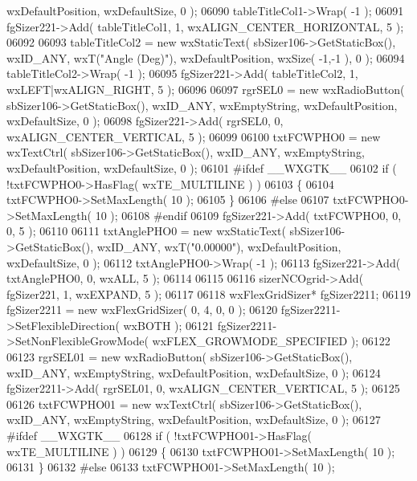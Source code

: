 \begin{DoxyCode}
      wxDefaultPosition, wxDefaultSize, 0 );
06090     tableTitleCol1->Wrap( -1 );
06091     fgSizer221->Add( tableTitleCol1, 1, wxALIGN\_CENTER\_HORIZONTAL, 5 );
06092     
06093     tableTitleCol2 = \textcolor{keyword}{new} wxStaticText( sbSizer106->GetStaticBox(), wxID\_ANY, wxT(\textcolor{stringliteral}{"Angle (Deg)"}), 
      wxDefaultPosition, wxSize( -1,-1 ), 0 );
06094     tableTitleCol2->Wrap( -1 );
06095     fgSizer221->Add( tableTitleCol2, 1, wxLEFT|wxALIGN\_RIGHT, 5 );
06096     
06097     rgrSEL0 = \textcolor{keyword}{new} wxRadioButton( sbSizer106->GetStaticBox(), wxID\_ANY, wxEmptyString, wxDefaultPosition, 
      wxDefaultSize, 0 );
06098     fgSizer221->Add( rgrSEL0, 0, wxALIGN\_CENTER\_VERTICAL, 5 );
06099     
06100     txtFCWPHO0 = \textcolor{keyword}{new} wxTextCtrl( sbSizer106->GetStaticBox(), wxID\_ANY, wxEmptyString, wxDefaultPosition, 
      wxDefaultSize, 0 );
06101 \textcolor{preprocessor}{    #ifdef \_\_WXGTK\_\_}
06102     \textcolor{keywordflow}{if} ( !txtFCWPHO0->HasFlag( wxTE\_MULTILINE ) )
06103     \{
06104     txtFCWPHO0->SetMaxLength( 10 );
06105     \}
06106 \textcolor{preprocessor}{    #else}
06107     txtFCWPHO0->SetMaxLength( 10 );
06108 \textcolor{preprocessor}{    #endif}
06109     fgSizer221->Add( txtFCWPHO0, 0, 0, 5 );
06110     
06111     txtAnglePHO0 = \textcolor{keyword}{new} wxStaticText( sbSizer106->GetStaticBox(), wxID\_ANY, wxT(\textcolor{stringliteral}{"0.00000"}), 
      wxDefaultPosition, wxDefaultSize, 0 );
06112     txtAnglePHO0->Wrap( -1 );
06113     fgSizer221->Add( txtAnglePHO0, 0, wxALL, 5 );
06114     
06115     
06116     sizerNCOgrid->Add( fgSizer221, 1, wxEXPAND, 5 );
06117     
06118     wxFlexGridSizer* fgSizer2211;
06119     fgSizer2211 = \textcolor{keyword}{new} wxFlexGridSizer( 0, 4, 0, 0 );
06120     fgSizer2211->SetFlexibleDirection( wxBOTH );
06121     fgSizer2211->SetNonFlexibleGrowMode( wxFLEX\_GROWMODE\_SPECIFIED );
06122     
06123     rgrSEL01 = \textcolor{keyword}{new} wxRadioButton( sbSizer106->GetStaticBox(), wxID\_ANY, wxEmptyString, wxDefaultPosition, 
      wxDefaultSize, 0 );
06124     fgSizer2211->Add( rgrSEL01, 0, wxALIGN\_CENTER\_VERTICAL, 5 );
06125     
06126     txtFCWPHO01 = \textcolor{keyword}{new} wxTextCtrl( sbSizer106->GetStaticBox(), wxID\_ANY, wxEmptyString, wxDefaultPosition, 
      wxDefaultSize, 0 );
06127 \textcolor{preprocessor}{    #ifdef \_\_WXGTK\_\_}
06128     \textcolor{keywordflow}{if} ( !txtFCWPHO01->HasFlag( wxTE\_MULTILINE ) )
06129     \{
06130     txtFCWPHO01->SetMaxLength( 10 );
06131     \}
06132 \textcolor{preprocessor}{    #else}
06133     txtFCWPHO01->SetMaxLength( 10 );

\end{DoxyCode}
